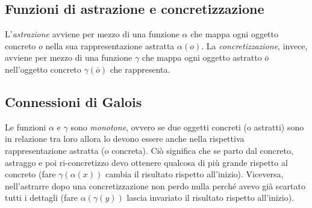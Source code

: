 \documentclass[a4paper,oneside,titlepage]{book}
\begin{document}
\subsection{Funzioni di astrazione e concretizzazione}
L'\textit{astrazione} avviene per mezzo di una funzione $\alpha$ che mappa ogni oggetto concreto $o$ nella sua rappresentazione astratta $\alpha(o)$. La \textit{concretizzazione}, invece, avviene per mezzo di una funzione $\gamma$ che mappa ogni oggetto astratto $\bar{o}$ nell'oggetto concreto $\gamma(\bar{o})$ che rappresenta.

\subsection{Connessioni di Galois}
Le funzioni $\alpha$ e $\gamma$ sono \textit{monotone}, ovvero se due oggetti concreti (o astratti) sono in relazione tra loro allora lo devono essere anche nella rispettiva rappresentazione astratta (o concreta). Ciò significa che se parto dal concreto, astraggo e poi ri-concretizzo devo ottenere qualcosa di più grande rispetto al concreto (fare $\gamma(\alpha(x))$ cambia il risultato rispetto all'inizio). Viceversa, nell'astrarre dopo una concretizzazione non perdo nulla perché avevo già scartato tutti i dettagli (fare $\alpha(\gamma(y))$ lascia invariato il risultato rispetto all'inizio).
\end{document}

